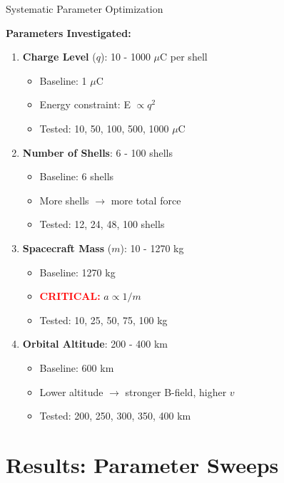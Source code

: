 \documentclass[11pt]{beamer}
\begin{document}
\begin{frame}{Systematic Parameter Optimization}

\textbf{Parameters Investigated:}

\begin{enumerate}
\item \textbf{Charge Level} ($q$): 10 - 1000 $\mu$C per shell
\begin{itemize}
\item Baseline: 1 $\mu$C
\item Energy constraint: E $\propto q^2$
\item Tested: 10, 50, 100, 500, 1000 $\mu$C
\end{itemize}

\item \textbf{Number of Shells}: 6 - 100 shells
\begin{itemize}
\item Baseline: 6 shells
\item More shells $\rightarrow$ more total force
\item Tested: 12, 24, 48, 100 shells
\end{itemize}

\item \textbf{Spacecraft Mass} ($m$): 10 - 1270 kg
\begin{itemize}
\item Baseline: 1270 kg
\item \textcolor{red}{\textbf{CRITICAL:}} $a \propto 1/m$
\item Tested: 10, 25, 50, 75, 100 kg
\end{itemize}

\item \textbf{Orbital Altitude}: 200 - 400 km
\begin{itemize}
\item Baseline: 600 km
\item Lower altitude $\rightarrow$ stronger B-field, higher $v$
\item Tested: 200, 250, 300, 350, 400 km
\end{itemize}
\end{enumerate}

\end{frame}

\section{Results: Parameter Sweeps}
\end{document}
